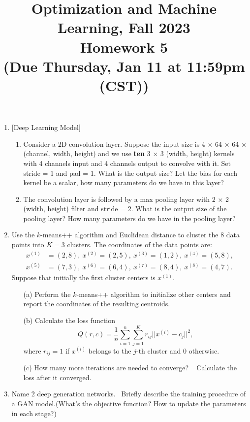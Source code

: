 \documentclass[10pt]{article}
\begin{document}
\date{}
\title{Optimization and Machine Learning, Fall 2023 \\
	Homework 5 \\
	\small (Due Thursday, Jan 11 at 11:59pm (CST))}
\maketitle
\begin{enumerate}[1.]

	\item {} [Deep Learning Model]
	\begin{enumerate}
		\item Consider a 2D convolution layer. Suppose the input size is 4 $\times$ 64 $\times$ 64 $\times$ (channel, width, height) and
		we use \textbf{ten} 3 $\times$ 3 (width, height) kernels with 4 channels input and 4 channels output to convolve with it. Set stride = 1 and pad = 1. What is 
		the output size? Let the bias for each kernel be a scalar, how many parameters do we have in this layer? 
		\item The convolution layer is followed by a max pooling layer with 2 × 2 (width, height) filter and stride
		= 2. What is the output size of the pooling layer? How many parameters do we have in the pooling
		layer? 
	\end{enumerate} \newpage


	\item {} Use the $k$-means++ algorithm and Euclidean distance to cluster the 8 data points into $K=3$ clusters.
	      The coordinates of the data points are:
	      \begin{align*}
		      x^{(1)} & = (2,8),  \ x^{(2)} = (2,5), \ x^{(3)} = (1,2), \ x^{(4)} = (5,8), \\
		      x^{(5)} & = (7,3),  \ x^{(6)} = (6,4), \ x^{(7)} = (8,4), \ x^{(8)} = (4,7).
	      \end{align*}
	      Suppose that initially the first cluster centers is $x^{(1)}$.
	      \begin{itemize}
		      \item[(a)] Perform the $k$-means++ algorithm to initialize other centers and report the coordinates of the resulting centroids. ~
		      \item[(b)] Calculate the loss function
		            \begin{equation}
			            Q(r,c) = \frac{1}{n} \sum_{i=1}^n \sum_{j=1}^K r_{ij}||x^{(i)} - c_j||^2,
		            \end{equation}
		            where $r_{ij} = 1$ if $x^{(i)}$ belongs to the $j$-th cluster and 0 otherwise. ~
		      \item[(c)] How many more iterations are needed to converge? ~ Calculate the loss after it converged.~
	      \end{itemize} \newpage


	\item {} Name 2 deep generation networks.~ Briefly describe the training procedure of a GAN model.(What's the objective function? How to update the parameters in each stage?)~\\

\end{enumerate}
\end{document}
